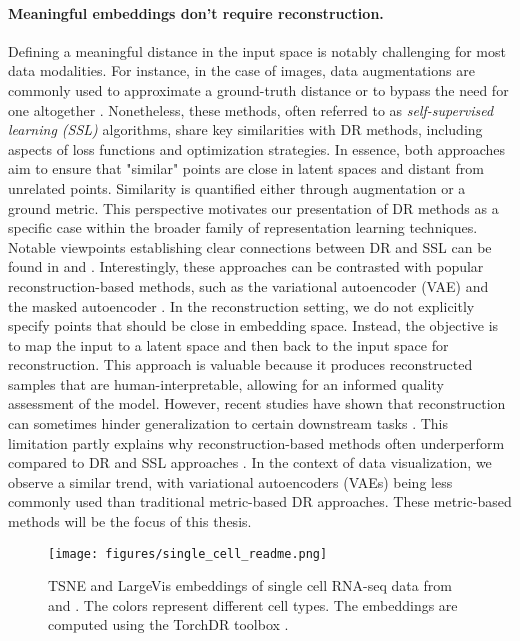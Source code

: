 \paragraph{Meaningful embeddings don't require reconstruction.}
Defining a meaningful distance in the input space is notably challenging for most data modalities. For instance, in the case of images, data augmentations are commonly used to approximate a ground-truth distance or to bypass the need for one altogether \citep{chen2020simple}. Nonetheless, these methods, often referred to as \emph{self-supervised learning (SSL)} algorithms, share key similarities with DR methods, including aspects of loss functions and optimization strategies. In essence, both approaches aim to ensure that "similar" points are close in latent spaces and distant from unrelated points. Similarity is quantified either through augmentation or a ground metric.
This perspective motivates our presentation of DR methods as a specific case within the broader family of representation learning techniques.
Notable viewpoints establishing clear connections between DR and SSL can be found in \citep{balestriero2022contrastive} and \citep{tan2023contrastive}. 
Interestingly, these approaches can be contrasted with popular reconstruction-based methods, such as the variational autoencoder (VAE) \citep{kingma2013auto} and the masked autoencoder \citep{he2022masked}. In the reconstruction setting, we do not explicitly specify points that should be close in embedding space. Instead, the objective is to map the input to a latent space and then back to the input space for reconstruction. This approach is valuable because it produces reconstructed samples that are human-interpretable, allowing for an informed quality assessment of the model. However, recent studies have shown that reconstruction can sometimes hinder generalization to certain downstream tasks \citep{balestriero2024learning}. This limitation partly explains why reconstruction-based methods often underperform compared to DR and SSL approaches \citep{otero2024self}.
In the context of data visualization, we observe a similar trend, with variational autoencoders (VAEs) being less commonly used than traditional metric-based DR approaches. These metric-based methods will be the focus of this thesis.

\begin{figure}[t]
    \centering
    \texttt{[image: figures/single\_cell\_readme.png]}
    \caption{TSNE and LargeVis embeddings of single cell RNA-seq data from \citep{macosko2015highly} and \citep{zheng2017massively}. The colors represent different cell types. The embeddings are computed using the TorchDR toolbox \citep{vanassel2024torchdr}.
    }
    \label{fig:intro_fig}
\end{figure}



